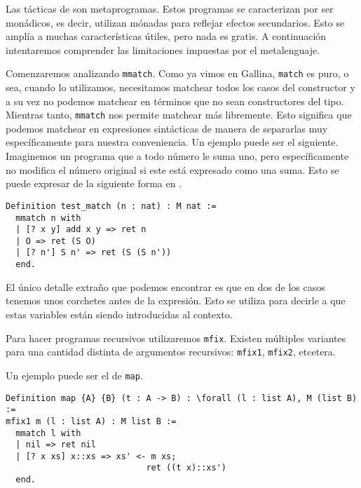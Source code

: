 Las tácticas de \mtac son metaprogramas.
Estos programas se caracterizan por ser monádicos, es decir, utilizan mónadas para reflejar efectos secundarios.
Esto se amplía a muchas características útiles, pero nada es gratis.
A continuación intentaremos comprender las limitaciones impuestas por el metalenguaje.

Comenzaremos analizando \lstinline{mmatch}. Como ya vimos en Gallina, \lstinline{match} es puro, o sea, cuando lo utilizamos, necesitamos matchear todos los casos del constructor y a su vez no podemos matchear en términos que no sean constructores del tipo.
Mientras tanto, \lstinline{mmatch} nos permite matchear más libremente.
Esto significa que podemos matchear en expresiones sintácticas de manera de separarlas muy específicamente para nuestra conveniencia.
Un ejemplo puede ser el siguiente.
Imaginemos un programa que a todo número le suma uno, pero específicamente no modifica el número original si este está expresado como una suma. Esto se puede expresar de la siguiente forma en \Mtac.

\begin{lstlisting}
Definition test_match (n : nat) : M nat :=
  mmatch n with
  | [? x y] add x y => ret n
  | O => ret (S O)
  | [? n'] S n' => ret (S (S n'))
  end.
\end{lstlisting}

El único detalle extraño que podemos encontrar es que en dos de los casos tenemos unos corchetes antes de la expresión.
Esto se utiliza para decirle a \Mtac que estas variables están siendo introducidas al contexto.

Para hacer programas recursivos utilizaremos \lstinline{mfix}. Existen múltiples variantes para una cantidad distinta de argumentos recursivos: \lstinline{mfix1}, \lstinline{mfix2}, etcetera.

Un ejemplo puede ser el de \lstinline{map}.

\begin{lstlisting}
Definition map {A} {B} (t : A -> B) : \forall (l : list A), M (list B) :=
mfix1 m (l : list A) : M list B :=
  mmatch l with
  | nil => ret nil
  | [? x xs] x::xs => xs' <- m xs;
                            ret ((t x)::xs')
  end.
\end{lstlisting}


